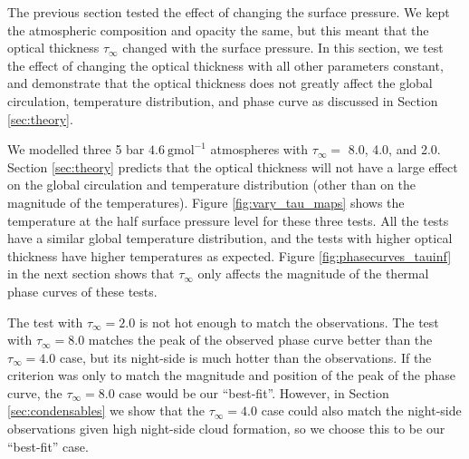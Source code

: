 The previous section tested the effect of changing the surface pressure. We kept the atmospheric composition and opacity the same, but this meant that the optical thickness $\tau_{\infty}$ changed with the surface pressure. In this section, we test the effect of changing the optical thickness with all other parameters constant, and demonstrate that the optical thickness does not greatly affect the global circulation, temperature distribution, and phase curve as discussed in Section \ref{sec:theory}.

We modelled three 5 bar $4.6\ \mathrm{gmol}^{-1}$ atmospheres with $\tau_{\infty} =$ 8.0, 4.0, and 2.0. Section \ref{sec:theory} predicts that the optical thickness will not have a large effect on the global circulation and temperature distribution (other than on the magnitude of the temperatures). Figure \ref{fig:vary_tau_maps} shows the temperature at the half surface pressure level for these three tests. All the tests have a similar global temperature distribution, and the tests with higher optical thickness have higher temperatures as expected. Figure \ref{fig:phasecurves_tauinf} in the next section shows that $\tau_{\infty}$ only affects the magnitude of the thermal phase curves of these tests.

The test with $\tau_{\infty} = 2.0$ is not hot enough to match the observations. The test with $\tau_{\infty} = 8.0$ matches the peak of the observed phase curve better than the $\tau_{\infty} = 4.0$ case, but its night-side is much hotter than the observations. If the criterion was only to match the magnitude and position of the peak of the phase curve, the $\tau_{\infty} = 8.0$ case would be our ``best-fit''. However, in Section \ref{sec:condensables} we show that the $\tau_{\infty} = 4.0$ case could also match the night-side observations given high night-side cloud formation, so we choose this to be our ``best-fit'' case.


